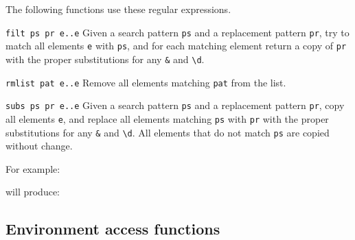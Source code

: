 The following functions use these regular expressions.
\begin{desctab}
\item[\texttt{filt ps pr e..e}]
Given a search pattern \texttt{ps} and a replacement pattern \texttt{pr},
try to match all elements \texttt{e} with \texttt{ps},
and for each matching element return a copy of \texttt{pr}
with the proper substitutions for any \texttt{\&} and \verb!\d!.

\item[\texttt{rmlist pat e..e}]
Remove all elements matching \texttt{pat} from the list.

\item[\texttt{subs ps pr e..e}]
Given a search pattern \texttt{ps} and a replacement pattern \texttt{pr},
copy all elements \texttt{e},
and replace all elements matching \texttt{ps} with \texttt{pr}
with the proper substitutions for any \texttt{\&} and \verb!\d!.
All elements that do not match \texttt{ps} are copied without change.
\end{desctab}

For example:
\begin{showfile}

\end{showfile}
will produce:
\begin{showfile}

\end{showfile}

\subsection{Environment access functions}
\nopagebreak

